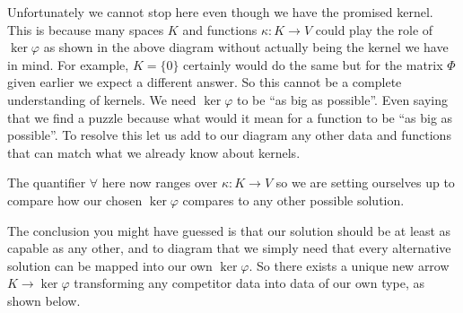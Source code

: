 \documentclass[12pt,twoside,dvipsnames,letterpaper]{memoir}
\begin{document}
Unfortunately we cannot stop here even though we have the promised kernel. This
is because many spaces $K$ and functions $\kappa:K\to V$ could play the role of
$\ker\varphi$ as shown in the above diagram without actually being the kernel we
have in mind.  For example, $K=\{0\}$ certainly would do the same but for the matrix
$\Phi$ given earlier we expect a different answer.  So this cannot be a complete
understanding of kernels.  We need $\ker\varphi$ to be ``as big as possible''.
Even saying that we find a puzzle because what would it mean for a function to
be ``as big as possible''.  To resolve this let us add to our diagram any other
data and functions that can match what we already know about kernels.
\begin{center}
\end{center}
The quantifier $\forall$ here now ranges over $\kappa:K\to V$ so we are 
setting ourselves up to compare how our chosen $\ker\varphi$ compares to 
any other possible solution.

The conclusion you might have guessed is that our solution should be 
at least as capable as any other, and to diagram that we simply need that 
every alternative solution can be mapped into our own $\ker \varphi$.  So there
exists a unique new arrow $K\to \ker\varphi$ transforming any competitor data 
into data of our own type, as shown below.
\begin{center}
\end{center}
\end{document}
